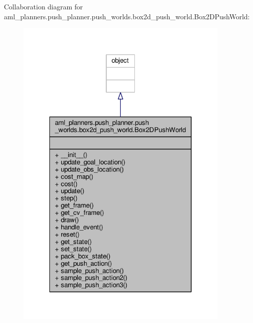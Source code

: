 Collaboration diagram for aml\-\_\-planners.\-push\-\_\-planner.\-push\-\_\-worlds.\-box2d\-\_\-push\-\_\-world.\-Box2\-D\-Push\-World\-:
\nopagebreak
\begin{figure}[H]
\begin{center}
\leavevmode
\includegraphics[width=294pt]{classaml__planners_1_1push__planner_1_1push__worlds_1_1box2d__push__world_1_1_box2_d_push_world__coll__graph}
\end{center}
\end{figure}
